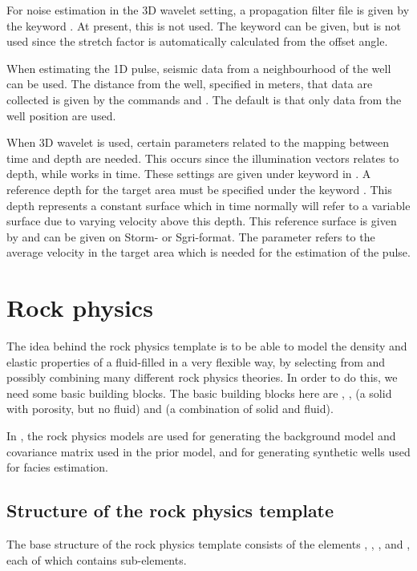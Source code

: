 For noise estimation in the 3D wavelet setting, a propagation filter
file is given by the keyword . At
present, this is not used. The keyword  can be
given, but is not used since the stretch factor is automatically
calculated from the offset angle. 

When estimating the 1D pulse, seismic data from a neighbourhood of the
well can be used. The distance from the well, specified in meters,
that data are collected is given by the commands
 and
. The default is that only data from
the well position are used.   

When 3D wavelet is used, certain parameters related to the mapping
between time and depth are needed. This occurs since the illumination
vectors relates to depth, while \crava works in time. These
settings are given under keyword
 in . A 
reference depth for the target area must be specified under the keyword
. This depth represents a constant surface which 
in time normally will refer to a variable surface due to varying
velocity above this depth. This reference surface is given by
 and can be given on Storm- or
Sgri-format. The parameter  refers to the average
velocity in the target area which is needed for the estimation of the
pulse.  

\section{Rock physics}
\label{sec:rockPhysics}
The idea behind the rock physics template is to be able to model the density and elastic properties of a fluid-filled  in a very flexible way, by selecting from and possibly combining many different rock physics theories. In order to do this, we need some basic building blocks. The basic building blocks here are , ,  (a solid with porosity, but no fluid) and  (a combination of solid and fluid).

In \crava, the rock physics models are used for generating the background model and covariance matrix used in the prior model, and for generating synthetic wells used for facies estimation. 

\subsection{Structure of the rock physics template}
The base structure of the rock physics template consists of the elements , , ,  and , each of which contains sub-elements.

